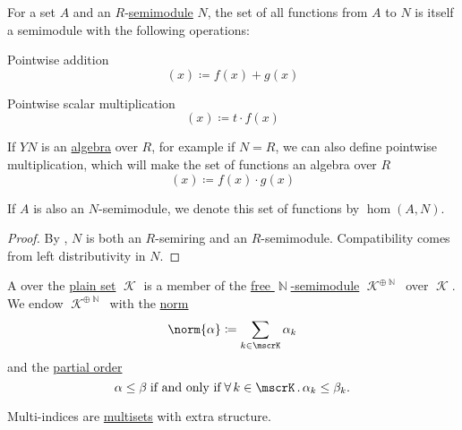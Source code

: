 \begin{proposition}\label{thm:functions_over_semimodule}
  For a set \( A \) and an \( R \)-\hyperref[def:semimodule]{semimodule} \( N \), the set of all functions from \( A \) to \( N \) is itself a semimodule with the following operations:
  \begin{thmenum}
     Pointwise addition
    \begin{equation*}
      [f + g](x) \coloneqq f(x) + g(x)
    \end{equation*}

     Pointwise scalar multiplication
    \begin{equation*}
      [t \cdot f](x) \coloneqq t \cdot f(x)
    \end{equation*}

     If \( YN\) is an \hyperref[def:algebra_over_semiring]{algebra} over \( R \), for example if \( N = R \), we can also define pointwise multiplication, which will make the set of functions an algebra over \( R \)
    \begin{equation*}
      [f \cdot g](x) \coloneqq f(x) \cdot g(x)
    \end{equation*}
  \end{thmenum}

  If \( A \) is also an \( N \)-semimodule, we denote this set of functions by \( \hom(A, N) \).
\end{proposition}
\begin{proof}
  By , \( N \) is both an \( R \)-semiring and an \( R \)-semimodule. Compatibility comes from left distributivity in \( N \).
\end{proof}

\begin{definition}\label{def:multi_index}\mimprovised
  A  over the \hyperref[def:set]{plain set} \( \mscrK \) is a member of the \hyperref[def:free_semimodule]{free \( \BbbN \)-semimodule} \( \mscrK^{\oplus \BbbN} \) over \( \mscrK \). We endow \( \mscrK^{\oplus \BbbN} \) with the \hyperref[def:norm]{norm}
  \begin{equation*}
    \norm{ \alpha } \coloneqq \sum_{k \in \mscrK} \alpha_k
  \end{equation*}
  and the \hyperref[def:partially_ordered_set]{partial order}
  \begin{equation*}
    \alpha \leq \beta \T{if and only if} \qforall {k \in \mscrK} \alpha_k \leq \beta_k.
  \end{equation*}

  Multi-indices are \hyperref[def:weighted_set/multiset]{multisets} with extra structure.
\end{definition}

